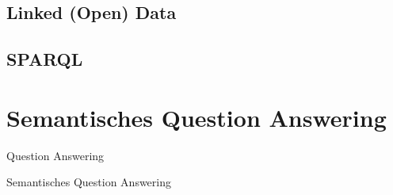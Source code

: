 \subsection{Linked (Open) Data}
\subsection{SPARQL}

\section{Semantisches Question Answering}

\begin{definition}{Question Answering}

\end{definition}

\begin{definition}{Semantisches Question Answering}

\end{definition}
